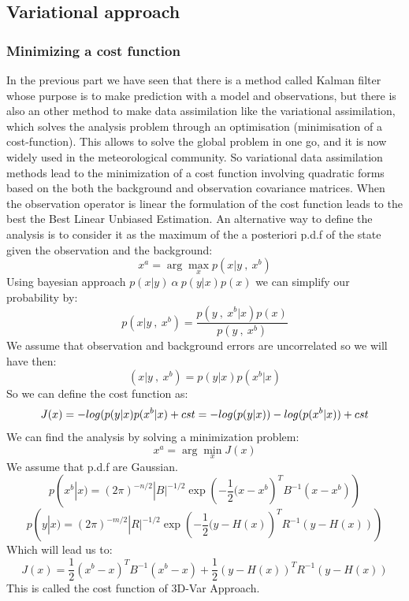 \subsection{Variational approach}
\subsubsection{Minimizing a cost function}
\noindent In the previous part we have seen that there is a method called Kalman filter whose purpose is to make prediction with a model and observations, but there is also an other method to make data assimilation like the variational assimilation, which solves the analysis problem through an optimisation (minimisation of a cost-function). This allows to solve the global problem in one go, and it is now widely used in the meteorological community. So variational data assimilation methods lead to the minimization of a cost function involving quadratic forms based on the both the background and observation covariance matrices. When the observation operator is linear the formulation of the cost function leads to the best the Best Linear Unbiased Estimation. An alternative way to define the analysis is to consider it as the maximum of the a posteriori p.d.f of the state given the observation and the background:
$$x^a=\arg\max_{x}p(x|y ~ , ~ x^b)$$
Using bayesian approach $p(x|y)~\alpha~ p(y|x)p(x)$ we can simplify our probability by:
$$p(x|y ~ , ~ x^b)=\frac{p(y ~ , ~ x^b| x)p(x)}{p(y ~ , ~ x^b)}$$
We assume that observation and background errors are uncorrelated so we will have then:
$$(x|y ~ , ~ x^b)=p(y|x)p(x^b|x)$$
So we can define the cost function as:
$$J(x)=-log(p(y|x)p(x^b|x)+cst \\
=-log(p(y|x))-log(p(x^b|x))+cst$$
We can find the analysis by solving a minimization problem:
$$x^a=\arg\min_{x}J(x)$$
We assume that p.d.f are Gaussian.
$$p(x^b|x)=(2\pi)^{-n/2}|B|^{-1/2}\exp({-\frac{1}{2}(x-x^b})^TB^{-1}(x-x^b))$$
$$p(y|x)=(2\pi)^{-m/2}|R|^{-1/2}\exp({-\frac{1}{2}(y-H(x)})^TR^{-1}(y-H(x)))$$
Which will lead us to:
$$J(x)=\frac{1}{2}(x^b-x)^TB^{-1}(x^b-x)+\frac{1}{2}(y-H(x))^TR^{-1}(y-H(x))$$
This is called the cost function of 3D-Var Approach.

